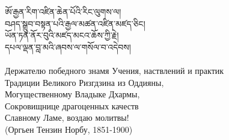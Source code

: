 {\ti ཨོ་རྒྱན་རིག་འཛིན་ཆེན་པོའི་རིང་ལུགས་ལ། \\
བཤད་སྒྲུབ་བསྟན་པའི་རྒྱལ་མཚན་འཛིན་མཛད་ཅིང།\\
 ཡོན་ཏན་ནོར་བུའི་མཛད་མངའ་ཆོས་ཀྱི་རྗེ། \\
དཔལ་ལྡན་བླ་མའི་ཞབས་ལ་གསོལ་བ་འདེབས།}\\
\\
\ru
Держателю победного знамя Учения, наствлений и практик\\
Традиции Великого Ризгдзина из Оддияны,\\
Могущественному Владыке Дхармы, \\
Сокровищнице драгоценных качеств \\
Славному Ламе, воздаю молитвы! \\
\hspace{1cm} (Оргьен Тензин Норбу, 1851-1900)\\
\\







